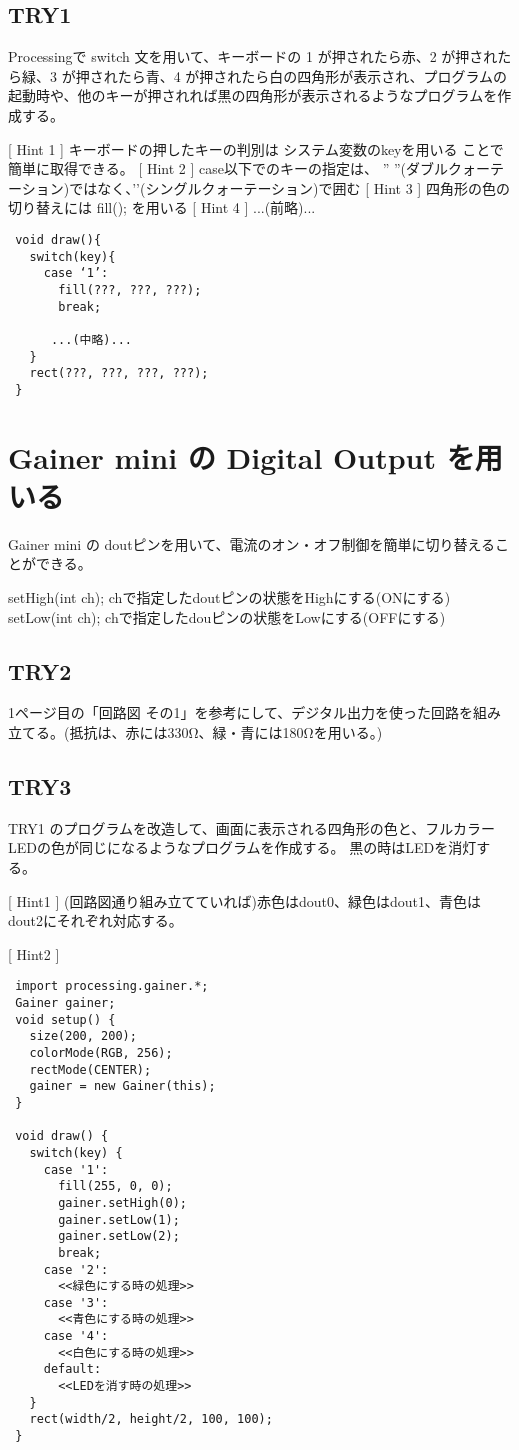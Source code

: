 \documentclass[11pt,a4paper]{jarticle}
\begin{document}
\subsection*{TRY1}
Processingで switch 文を用いて、キーボードの 1 が押されたら赤、2 が押されたら緑、3 が押されたら青、4 が押されたら白の四角形が表示され、プログラムの起動時や、他のキーが押されれば黒の四角形が表示されるようなプログラムを作成する。

[ Hint 1 ]
 キーボードの押したキーの判別は システム変数のkeyを用いる ことで簡単に取得できる。
[ Hint 2 ]
 case以下でのキーの指定は、
 ” ”(ダブルクォーテーション)ではなく、’’(シングルクォーテーション)で囲む
[ Hint 3 ]
 四角形の色の切り替えには fill(); を用いる
[ Hint 4 ]
...(前略)...
\begin{lstlisting}
 void draw(){
   switch(key){
     case ‘1’:
       fill(???, ???, ???);
       break;
 
      ...(中略)...
   }
   rect(???, ???, ???, ???);
 }
\end{lstlisting}

\section{Gainer mini の Digital Output を用いる}
Gainer mini の doutピンを用いて、電流のオン・オフ制御を簡単に切り替えることができる。

setHigh(int ch);
chで指定したdoutピンの状態をHighにする(ONにする)
setLow(int ch);
chで指定したdouピンの状態をLowにする(OFFにする)

\subsection*{TRY2}
1ページ目の「回路図 その1」を参考にして、デジタル出力を使った回路を組み立てる。(抵抗は、赤には330Ω、緑・青には180Ωを用いる。)

\subsection*{TRY3}
TRY1 のプログラムを改造して、画面に表示される四角形の色と、フルカラーLEDの色が同じになるようなプログラムを作成する。
黒の時はLEDを消灯する。

[ Hint1 ]
(回路図通り組み立てていれば)赤色はdout0、緑色はdout1、青色はdout2にそれぞれ対応する。

[ Hint2 ]
\begin{lstlisting}
 import processing.gainer.*;
 Gainer gainer;
 void setup() {
   size(200, 200);
   colorMode(RGB, 256);
   rectMode(CENTER);
   gainer = new Gainer(this);
 }
 
 void draw() {
   switch(key) {
     case '1':
       fill(255, 0, 0);
       gainer.setHigh(0);
       gainer.setLow(1);
       gainer.setLow(2);
       break;
     case '2':
       <<緑色にする時の処理>>
     case '3':
       <<青色にする時の処理>>
     case '4':
       <<白色にする時の処理>>
     default:
       <<LEDを消す時の処理>>
   }
   rect(width/2, height/2, 100, 100); 
 }
\end{lstlisting}
\end{document}
